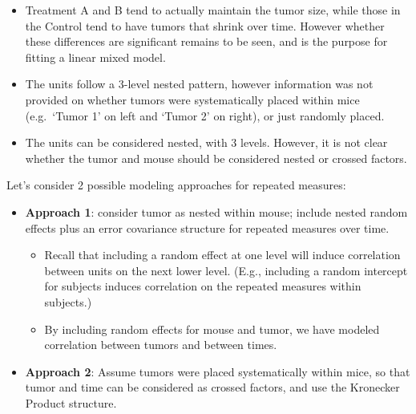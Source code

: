 \documentclass[
  9pt,
  ignorenonframetext,
]{beamer}
\begin{document}
\begin{frame}{}
\protect\hypertarget{section}{}
\begin{itemize}
\item
  Treatment A and B tend to actually maintain the tumor size, while
  those in the Control tend to have tumors that shrink over time.
  However whether these differences are significant remains to be seen,
  and is the purpose for fitting a linear mixed model.
\item
  The units follow a 3-level nested pattern, however information was not
  provided on whether tumors were systematically placed within mice
  (e.g.~`Tumor 1' on left and `Tumor 2' on right), or just randomly
  placed.
\item
  The units can be considered nested, with 3 levels. However, it is not
  clear whether the tumor and mouse should be considered nested or
  crossed factors.
\end{itemize}
\end{frame}

\begin{frame}{}
\protect\hypertarget{section-1}{}
Let's consider 2 possible modeling approaches for repeated measures:

\begin{itemize}
\item
  \textbf{Approach 1}: consider tumor as nested within mouse; include
  nested random effects plus an error covariance structure for repeated
  measures over time.

  \begin{itemize}
  \item
    Recall that including a random effect at one level will induce
    correlation between units on the next lower level. (E.g., including
    a random intercept for subjects induces correlation on the repeated
    measures within subjects.)
  \item
    By including random effects for mouse and tumor, we have modeled
    correlation between tumors and between times.
  \end{itemize}
\item
  \textbf{Approach 2}: Assume tumors were placed systematically within
  mice, so that tumor and time can be considered as crossed factors, and
  use the Kronecker Product structure.
\end{itemize}
\end{frame}
\end{document}
